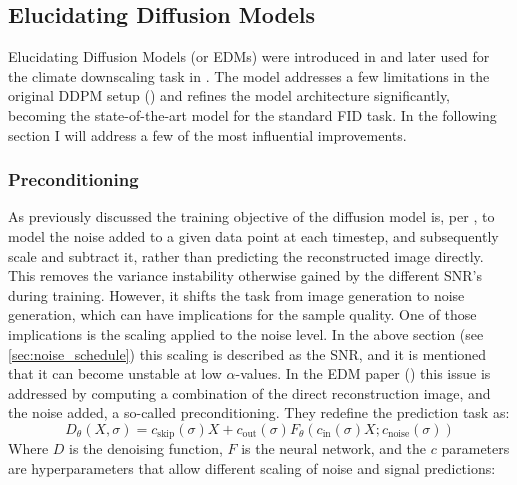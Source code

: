 \subsection{Elucidating Diffusion Models} \label{sec:edm-background}

Elucidating Diffusion Models (or EDMs) were introduced in \cite{edm} and later used for the climate downscaling task in \cite{thea}. The model addresses a few limitations in the original DDPM setup (\cite{ddpm}) and refines the model architecture significantly, becoming the state-of-the-art model for the standard FID task. In the following section I will address a few of the most influential improvements.

\subsubsection{Preconditioning}

As previously discussed the training objective of the diffusion model is, per \cite{ddpm}, to model the noise added to a given data point at each timestep, and subsequently scale and subtract it, rather than predicting the reconstructed image directly. This removes the variance instability otherwise gained by the different SNR's during training. However, it shifts the task from image generation to noise generation, which can have implications for the sample quality. One of those implications is the scaling applied to the noise level. In the above section (see \cref{sec:noise_schedule}) this scaling is described as the SNR, and it is mentioned that it can become unstable at low $\alpha$-values. In the EDM paper (\cite{edm}) this issue is addressed by computing a combination of the direct reconstruction image, and the noise added, a so-called preconditioning. They redefine the prediction task as:
\begin{equation} \label{eq:edm_loss}
    D_{\theta}(X, \sigma)=c_{\text{skip}}(\sigma) X + c_{\text{out}}(\sigma)F_{\theta} \left( c_{\text{in}}(\sigma)X; c_{\text{noise}}(\sigma) \right)
\end{equation}
Where $D$ is the denoising function, $F$ is the neural network, and the $c$ parameters are hyperparameters that allow different scaling of noise and signal predictions:


